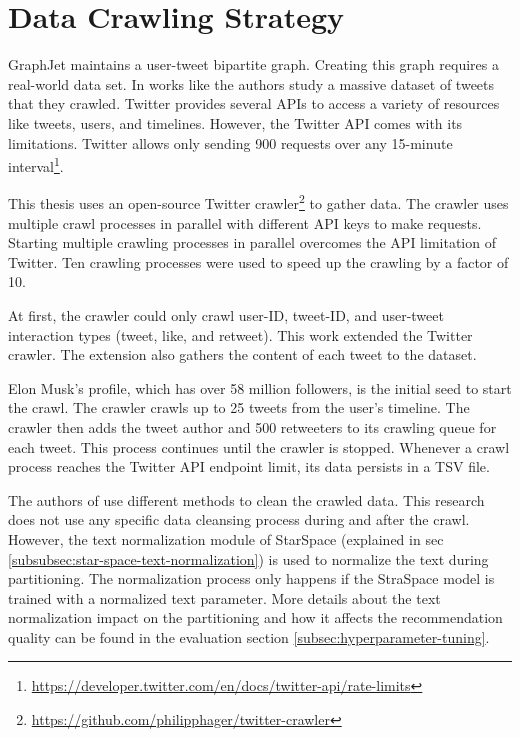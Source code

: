 \section{Data Crawling Strategy}
\label{sec:data-crawling-strategy}

GraphJet maintains a user-tweet bipartite graph. Creating this graph requires a real-world data set. In works like \cite{kwakWhatTwitterSocial2010} the authors study a massive dataset of tweets that they crawled. Twitter provides several APIs to access a variety of resources like tweets, users, and timelines. However, the Twitter API comes with its limitations. Twitter allows only sending 900 requests over any 15-minute interval\footnote{\url{https://developer.twitter.com/en/docs/twitter-api/rate-limits}}. 


This thesis uses an open-source Twitter crawler\footnote{\url{https://github.com/philipphager/twitter-crawler}} to gather data. The crawler uses multiple crawl processes in parallel with different API keys to make requests. Starting multiple crawling processes in parallel overcomes the API limitation of Twitter. Ten crawling processes were used to speed up the crawling by a factor of 10. 


At first, the crawler could only crawl user-ID, tweet-ID, and user-tweet interaction types (tweet, like, and retweet). This work extended the Twitter crawler. The extension also gathers the content of each tweet to the dataset. 


Elon Musk's profile, which has over 58 million followers, is the initial seed to start the crawl. The crawler crawls up to 25 tweets from the user's timeline. The crawler then adds the tweet author and 500 retweeters to its crawling queue for each tweet. This process continues until the crawler is stopped. Whenever a crawl process reaches the Twitter API endpoint limit, its data persists in a TSV file.


The authors of \cite{kwakWhatTwitterSocial2010} use different methods to clean the crawled data. This research does not use any specific data cleansing process during and after the crawl. However, the text normalization module of StarSpace (explained in sec \ref{subsubsec:star-space-text-normalization}) is used to normalize the text during partitioning. The normalization process only happens if the StraSpace model is trained with a normalized text parameter. More details about the text normalization impact on the partitioning and how it affects the recommendation quality can be found in the evaluation section \ref{subsec:hyperparameter-tuning}.


